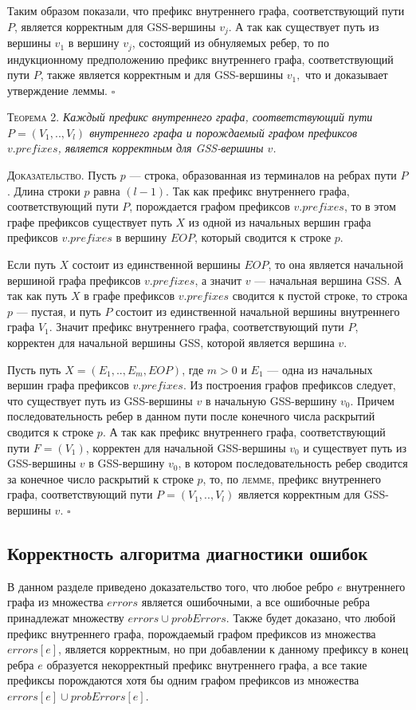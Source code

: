 Таким образом показали, что префикс внутреннего графа, соответствующий пути $P$, является корректным для GSS-вершины $v_{j}$. А так как существует путь из вершины $v_{1}$ в вершину $v_{j}$, состоящий из обнуляемых ребер, то по индукционному предположению префикс внутреннего графа, соответствующий пути $P$, также является корректным и для GSS-вершины $v_{1},$ что и доказывает утверждение леммы.
$\square$

\textsc{Теорема 2.} 
\textit{Каждый префикс внутреннего графа, соответствующий пути $P = (V_{1},..,V_{l})$ внутреннего графа и порождаемый графом префиксов $v.prefixes$, является корректным для GSS-вершины $v$.}

\textsc{Доказательство.}
Пусть $p$ --- строка, образованная из терминалов на ребрах пути $P$. Длина строки $p$ равна $(l-1)$. Так как префикс внутреннего графа, соответствующий пути $P$, порождается графом префиксов $v.prefixes$, то в этом графе префиксов существует путь $X$ из одной из начальных вершин графа префиксов $v.prefixes$ в вершину $EOP$, который сводится к строке $p$.

Если путь $X$ состоит из единственной вершины $EOP$, то она является начальной вершиной графа префиксов $v.prefixes$, а значит $v$ --- начальная вершина GSS. А так как путь $X$ в графе префиксов $v.prefixes$ сводится к пустой строке, то строка $p$ --- пустая, и путь $P$ состоит из единственной начальной вершины внутреннего графа $V_{1}$. Значит префикс внутреннего графа, соответствующий пути $P$, корректен для начальной вершины GSS, которой является вершина $v$.

Пусть путь $X = (E_{1},..,E_{m},EOP)$, где $m > 0$ и $E_{1}$ --- одна из начальных вершин графа префиксов $v.prefixes$. Из построения графов префиксов следует, что существует путь из GSS-вершины $v$ в начальную GSS-вершину $v_{0}$. Причем последовательность ребер в данном пути после конечного числа раскрытий сводится к строке $p$. А так как префикс внутреннего графа, соответствующий пути $F = (V_{1})$, корректен для начальной GSS-вершины $v_{0}$ и существует путь из GSS-вершины $v$ в GSS-вершину $v_{0}$, в котором последовательность ребер сводится за конечное число раскрытий к строке $p$, то, по \textsc{лемме}, префикс внутреннего графа, соответствующий пути $P = (V_{1},..,V_{l})$ является корректным для GSS-вершины $v$.
$\square$

\subsection{Корректность алгоритма диагностики ошибок}
В данном разделе приведено доказательство того, что любое ребро $e$ внутреннего графа из множества $errors$ является ошибочными, а все ошибочные ребра принадлежат множеству $errors \cup probErrors$. Также будет доказано, что любой префикс внутреннего графа, порождаемый графом префиксов из множества $errors[e]$, является корректным, но при добавлении к данному префиксу в конец ребра $e$ образуется некорректный префикс внутреннего графа, а все такие префиксы порождаются хотя бы одним графом префиксов из множества $errors[e] \cup probErrors[e]$.


